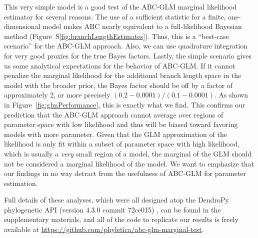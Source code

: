 This very simple model is a good test of the ABC-GLM marginal likelihood
estimator for several reasons.
The use of a sufficient statistic for a finite, one-dimensional model makes ABC
nearly equivalent to a full-likelihood Bayesian method
(Figure~S\ref{fig:branchLengthEstimates}).
Thus, this is a ``best-case scenario'' for the ABC-GLM approach.
Also, we can use quadrature integration for very good proxies for the true
Bayes factors.
Lastly, the simple scenario gives us some analytical expectations for the
behavior of ABC-GLM.
If it cannot penalize the marginal likelihood for the additional branch length
space in the model with the broader prior, the Bayes factor should be off by a
factor of approximately 2, or more precisely $(0.2-0.0001) / (0.1-0.0001)$.
As shown in Figure~\ref{fig:glmPerformance}, this is exactly what we find.
This confirms our prediction that the ABC-GLM approach cannot average over
regions of parameter space with low likelihood and thus will be biased toward
favoring models with more parameter.
Given that the GLM approximation of the likelihood is only fit within a subset
of parameter space with high likelihood, which is usually a \emph{very} small
region of a model, the marginal of the GLM should not be considered a marginal
likelihood of the model.
We want to emphasize that our findings in no way detract from the usefulness of
ABC-GLM for parameter estimation.

Full details of these analyses, which were all designed atop the DendroPy
phylogenetic API (version 4.3.0 commit 72ce015) \citep{Sukumaran2010}, can be
found in the supplementary materials, and all of the code to replicate our
results is freely available at
\href{https://github.com/phyletica/abc-glm-marginal-test}{https://github.com/phyletica/abc-glm-marginal-test}.




